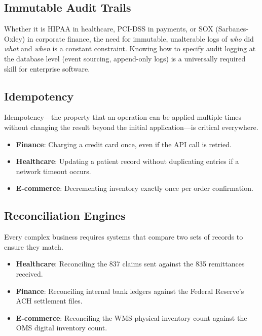 \documentclass[
  11pt,
  openany,
  oneside]{book}
\providecommand{\tightlist}{%
  \setlength{\itemsep}{0pt}\setlength{\parskip}{0pt}}
\begin{document}
\subsection{Immutable Audit Trails}\label{immutable-audit-trails}

Whether it is HIPAA in healthcare, PCI-DSS in payments, or SOX
(Sarbanes-Oxley) in corporate finance, the need for immutable,
unalterable logs of \emph{who} did \emph{what} and \emph{when} is a
constant constraint. Knowing how to specify audit logging at the
database level (event sourcing, append-only logs) is a universally
required skill for enterprise software.

\subsection{Idempotency}\label{idempotency}

Idempotency---the property that an operation can be applied multiple
times without changing the result beyond the initial application---is
critical everywhere.

\begin{itemize}
\tightlist
\item
  \textbf{Finance}: Charging a credit card once, even if the API call is
  retried.
\item
  \textbf{Healthcare}: Updating a patient record without duplicating
  entries if a network timeout occurs.
\item
  \textbf{E-commerce}: Decrementing inventory exactly once per order
  confirmation.
\end{itemize}

\subsection{Reconciliation Engines}\label{reconciliation-engines}

Every complex business requires systems that compare two sets of records
to ensure they match.

\begin{itemize}
\tightlist
\item
  \textbf{Healthcare}: Reconciling the 837 claims sent against the 835
  remittances received.
\item
  \textbf{Finance}: Reconciling internal bank ledgers against the
  Federal Reserve's ACH settlement files.
\item
  \textbf{E-commerce}: Reconciling the WMS physical inventory count
  against the OMS digital inventory count.
\end{itemize}
\end{document}
